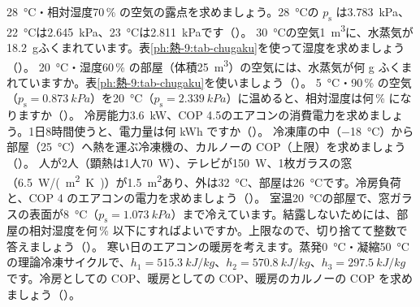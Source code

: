 \bkendproblems
{}
\bkproblem \qty{28}{\celsius}・相対湿度70\,\% の空気の露点を求めましょう。\qty{28}{\celsius}の $p_{\mathrm s}$ は\qty{3.783}{kPa}、\qty{22}{\celsius}は\qty{2.645}{kPa}、\qty{23}{\celsius}は\qty{2.811}{kPa}です（\nobreak{}\nobreak）。
\bkproblem \qty{30}{\celsius}の空気\qty{1}{m^3}に、水蒸気が\qty{18.2}{g}ふくまれています。表\ref{ph:熱-9:tab-chugaku}を使って湿度を求めましょう（\nobreak{}\nobreak）。
\bkproblem \qty{20}{\celsius}・湿度60\,\% の部屋（体積\qty{25}{m^3}）の空気には、水蒸気が何 g ふくまれていますか。表\ref{ph:熱-9:tab-chugaku}を使いましょう（\nobreak{}\nobreak）。
\bkproblem \qty{5}{\celsius}・90\,\% の空気（$p_{\mathrm s}=\qty{0.873}{kPa}$）を\qty{20}{\celsius}（$p_{\mathrm s}=\qty{2.339}{kPa}$）に温めると、相対湿度は何\,\% になりますか（\nobreak{}\nobreak）。
\bkproblem 冷房能力\qty{3.6}{kW}、COP 4.5のエアコンの消費電力を求めましょう。1日8時間使うと、電力量は何 kWh ですか（\nobreak{}\nobreak）。
\bkproblem 冷凍庫の中（\qty{-18}{\celsius}）から部屋（\qty{25}{\celsius}）へ熱を運ぶ冷凍機の、カルノーの COP（上限）を求めましょう（\nobreak{}\nobreak）。
\bkproblem 人が2人（顕熱は1人\qty{70}{W}）、テレビが\qty{150}{W}、1枚ガラスの窓（\qty{6.5}{W/(m^2.K)}）が\qty{1.5}{m^2}あり、外は\qty{32}{\celsius}、部屋は\qty{26}{\celsius}です。冷房負荷と、COP 4 のエアコンの電力を求めましょう（\nobreak{}\nobreak）。
\bkproblem 室温\qty{20}{\celsius}の部屋で、窓ガラスの表面が\qty{8}{\celsius}（$p_{\mathrm s}=\qty{1.073}{kPa}$）まで冷えています。結露しないためには、部屋の相対湿度を何\,\% 以下にすればよいですか。上限なので、切り捨てて整数で答えましょう（\nobreak{}\nobreak）。
\bkproblem 寒い日のエアコンの暖房を考えます。蒸発\qty{0}{\celsius}・凝縮\qty{50}{\celsius}の理論冷凍サイクルで、$h_1=\qty{515.3}{kJ/kg}$、$h_2=\qty{570.8}{kJ/kg}$、$h_3=\qty{297.5}{kJ/kg}$ です。冷房としての COP、暖房としての COP、暖房のカルノーの COP を求めましょう（\nobreak{}\nobreak）。
